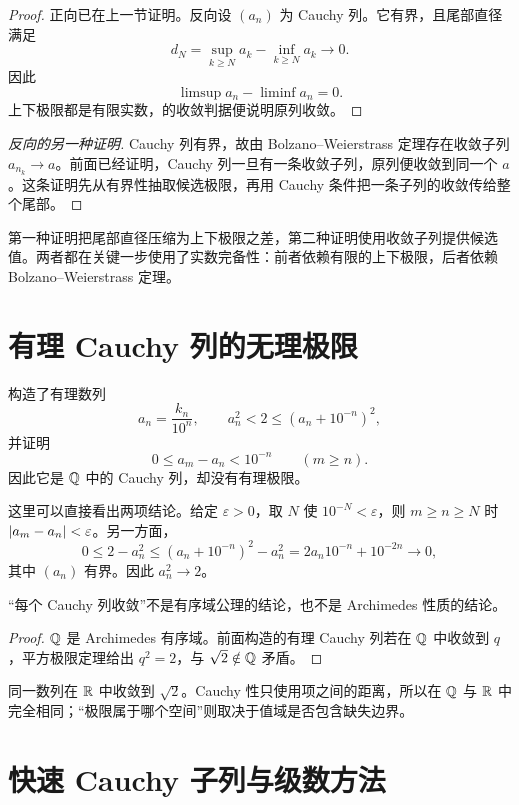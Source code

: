 \begin{proof}
正向已在上一节证明。反向设 \((a_n)\) 为 Cauchy 列。它有界，且尾部直径满足
\[
 d_N=\sup_{k\ge N}a_k-\inf_{k\ge N}a_k\longrightarrow0.
\]
因此
\[
 \limsup a_n-\liminf a_n=0.
\]
上下极限都是有限实数，的收敛判据便说明原列收敛。
\end{proof}

\begin{proof}[反向的另一种证明]
Cauchy 列有界，故由 Bolzano--Weierstrass 定理存在收敛子列
\(a_{n_k}\to a\)。前面已经证明，Cauchy 列一旦有一条收敛子列，原列便收敛到同一个 \(a\)。这条证明先从有界性抽取候选极限，再用 Cauchy 条件把一条子列的收敛传给整个尾部。
\end{proof}

第一种证明把尾部直径压缩为上下极限之差，第二种证明使用收敛子列提供候选值。两者都在关键一步使用了实数完备性：前者依赖有限的上下极限，后者依赖 Bolzano--Weierstrass 定理。

\section{有理 Cauchy 列的无理极限}


构造了有理数列
\[
 a_n=\frac{k_n}{10^n},\qquad
 a_n^2<2\le(a_n+10^{-n})^2,
\]
并证明
\[
 0\le a_m-a_n<10^{-n}\qquad(m\ge n).
\]
因此它是 \(\mathbb{Q}\) 中的 Cauchy 列，却没有有理极限。

这里可以直接看出两项结论。给定 \(\varepsilon>0\)，取
\(N\) 使 \(10^{-N}<\varepsilon\)，则 \(m\ge n\ge N\) 时
\(\left|a_m-a_n\right|<\varepsilon\)。另一方面，
\[
 0\le 2-a_n^2
 \le (a_n+10^{-n})^2-a_n^2
 =2a_n10^{-n}+10^{-2n}\longrightarrow0,
\]
其中 \((a_n)\) 有界。因此 \(a_n^2\to2\)。

\begin{theorem}
“每个 Cauchy 列收敛”不是有序域公理的结论，也不是 Archimedes 性质的结论。
\end{theorem}

\begin{proof}
\(\mathbb{Q}\) 是 Archimedes 有序域。前面构造的有理 Cauchy 列若在 \(\mathbb{Q}\) 中收敛到 \(q\)，平方极限定理给出 \(q^2=2\)，与 \(\sqrt2\notin\mathbb{Q}\) 矛盾。
\end{proof}

同一数列在 \(\mathbb{R}\) 中收敛到 \(\sqrt2\)。Cauchy 性只使用项之间的距离，所以在 \(\mathbb{Q}\) 与 \(\mathbb{R}\) 中完全相同；“极限属于哪个空间”则取决于值域是否包含缺失边界。

\section{快速 Cauchy 子列与级数方法}

